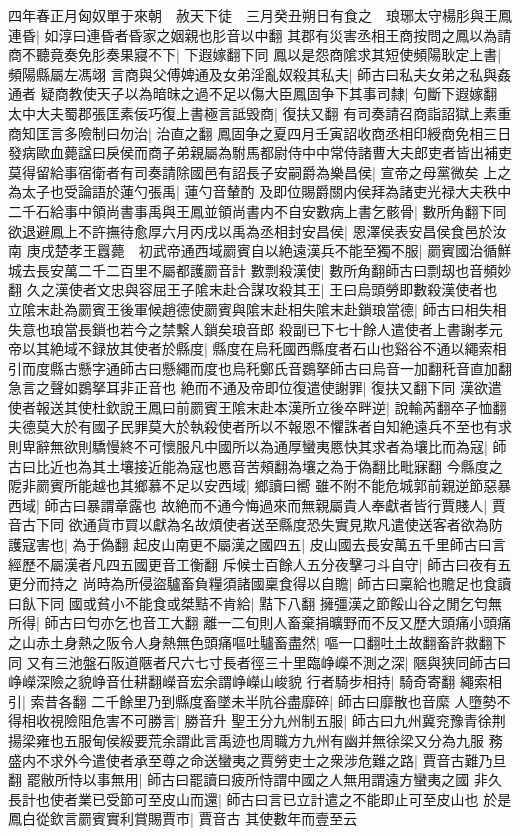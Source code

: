 四年春正月匈奴單于來朝　赦天下徒　三月癸丑朔日有食之　琅琊太守楊肜與王鳳連昏|{
	如淳曰連昏者昏家之姻親也肜音以中翻}
其郡有災害丞相王商按問之鳳以為請商不聽竟奏免肜奏果寢不下|{
	下遐嫁翻下同}
鳳以是怨商隂求其短使頻陽耿定上書|{
	頻陽縣屬左馮翊}
言商與父傅婢通及女弟淫亂奴殺其私夫|{
	師古曰私夫女弟之私與姦通者}
疑商教使天子以為暗昩之過不足以傷大臣鳳固争下其事司隸|{
	句斷下遐嫁翻}
太中大夫蜀郡張匡素佞巧復上書極言詆毁商|{
	復扶又翻}
有司奏請召商詣詔獄上素重商知匡言多險制曰勿治|{
	治直之翻}
鳳固争之夏四月壬寅詔收商丞相印綬商免相三日發病歐血薨諡曰戾侯而商子弟親屬為駙馬都尉侍中中常侍諸曹大夫郎吏者皆出補吏莫得留給事宿衛者有司奏請除國邑有詔長子安嗣爵為樂昌侯|{
	宣帝之母黨微矣}
上之為太子也受論語於蓮勺張禹|{
	蓮勺音輦酌}
及即位賜爵關内侯拜為諸吏光禄大夫秩中二千石給事中領尚書事禹與王鳳並領尚書内不自安數病上書乞骸骨|{
	數所角翻下同}
欲退避鳳上不許撫待愈厚六月丙戌以禹為丞相封安昌侯|{
	恩澤侯表安昌侯食邑於汝南}
庚戌楚孝王囂薨　初武帝通西域罽賓自以絶遠漢兵不能至獨不服|{
	罽賓國治循鮮城去長安萬二千二百里不屬都護罽音計}
數剽殺漢使|{
	數所角翻師古曰剽刼也音頻妙翻}
久之漢使者文忠與容屈王子隂末赴合謀攻殺其王|{
	王曰烏頭勞即數殺漢使者也}
立隂末赴為罽賓王後軍候趙德使罽賓與隂末赴相失隂末赴鎖琅當德|{
	師古曰相失相失意也琅當長鎖也若今之禁繫人鎖矣琅音郎}
殺副已下七十餘人遣使者上書謝孝元帝以其絶域不録放其使者於縣度|{
	縣度在烏秅國西縣度者石山也谿谷不通以繩索相引而度縣古懸字通師古曰懸繩而度也烏秅鄭氏音鷃拏師古曰烏音一加翻秅音直加翻急言之聲如鷃拏耳非正音也}
絶而不通及帝即位復遣使謝罪|{
	復扶又翻下同}
漢欲遣使者報送其使杜欽說王鳳曰前罽賓王隂末赴本漢所立後卒畔逆|{
	說輸芮翻卒子恤翻}
夫德莫大於有國子民罪莫大於執殺使者所以不報恩不懼誅者自知絶遠兵不至也有求則卑辭無欲則驕慢終不可懷服凡中國所以為通厚蠻夷㥦快其求者為壤比而為寇|{
	師古曰比近也為其土壤接近能為寇也㥦音苦頰翻為壤之為于偽翻比毗寐翻}
今縣度之阸非罽賓所能越也其鄉慕不足以安西域|{
	鄉讀曰嚮}
雖不附不能危城郭前親逆節惡暴西域|{
	師古曰暴謂章露也}
故絶而不通今悔過來而無親屬貴人奉獻者皆行賈賤人|{
	賈音古下同}
欲通貨市買以獻為名故煩使者送至縣度恐失實見欺凡遣使送客者欲為防護寇害也|{
	為于偽翻}
起皮山南更不屬漢之國四五|{
	皮山國去長安萬五千里師古曰言經歷不屬漢者凡四五國更音工衡翻}
斥候士百餘人五分夜擊刁斗自守|{
	師古曰夜有五更分而持之}
尚時為所侵盜驢畜負糧須諸國稟食得以自贍|{
	師古曰稟給也贍足也食讀曰飤下同}
國或貧小不能食或桀黠不肯給|{
	黠下八翻}
擁彊漢之節餒山谷之閒乞匄無所得|{
	師古曰匄亦乞也音工大翻}
離一二旬則人畜棄捐曠野而不反又歷大頭痛小頭痛之山赤土身熱之阪令人身熱無色頭痛嘔吐驢畜盡然|{
	嘔一口翻吐土故翻畜許救翻下同}
又有三池盤石阪道陿者尺六七寸長者徑三十里臨峥嶸不測之深|{
	陿與狭同師古曰峥嶸深險之貌峥音仕耕翻嶸音宏余謂峥嶸山峻貌}
行者騎步相持|{
	騎奇寄翻}
繩索相引|{
	索昔各翻}
二千餘里乃到縣度畜墜未半阬谷盡靡碎|{
	師古曰靡散也音縻}
人墮勢不得相收視險阻危害不可勝言|{
	勝音升}
聖王分九州制五服|{
	師古曰九州冀兖豫青徐荆揚梁雍也五服甸侯綏要荒余謂此言禹迹也周職方九州有幽并無徐梁又分為九服}
務盛内不求外今遣使者承至尊之命送蠻夷之賈勞吏士之衆涉危難之路|{
	賈音古難乃旦翻}
罷敝所恃以事無用|{
	師古曰罷讀曰疲所恃謂中國之人無用謂遠方蠻夷之國}
非久長計也使者業已受節可至皮山而還|{
	師古曰言已立計遣之不能即止可至皮山也}
於是鳳白從欽言罽賓實利賞賜賈市|{
	賈音古}
其使數年而壹至云

